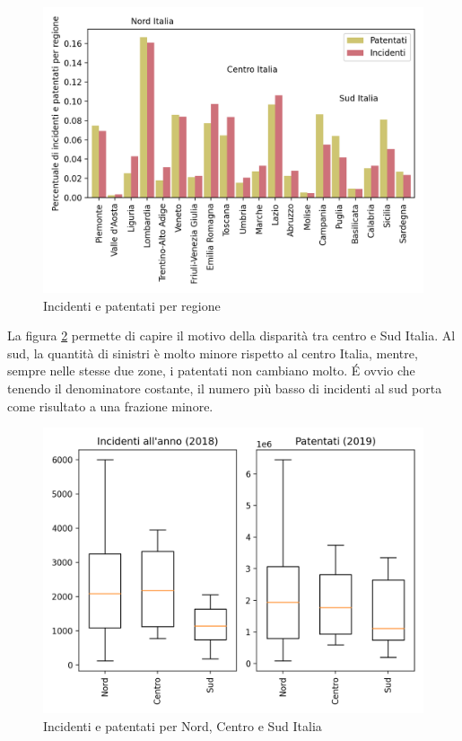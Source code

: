 \documentclass[a4paper,12pt]{report}
\begin{document}
\begin{figure}
    \hfill\includegraphics[width=0.7\linewidth]{../src/incidenti/incidenti_aci/mappe_regioni/incidenti_patenti_bar.png}\hspace*{\fill}
    \caption{Incidenti e patentati per regione}
    \label{fig:incidenti-patentati-bar}
\end{figure}

La figura \ref{fig:incidenti-patentati-box} permette di capire il motivo della disparità 
tra centro e Sud Italia.
Al sud, la quantità di sinistri è molto minore rispetto al centro Italia, mentre, 
sempre nelle stesse due zone, i patentati non cambiano molto. 
\'E ovvio che tenendo il denominatore costante, il numero più basso di incidenti al 
sud porta come risultato a una frazione minore.

\begin{figure}
    \hfill\includegraphics[width=0.7\linewidth]{../src/incidenti/incidenti_aci/mappe_regioni/incidenti_patenti_box.png}\hspace*{\fill}
    \caption{Incidenti e patentati per Nord, Centro e Sud Italia}
    \label{fig:incidenti-patentati-box}
\end{figure}
\end{document}
